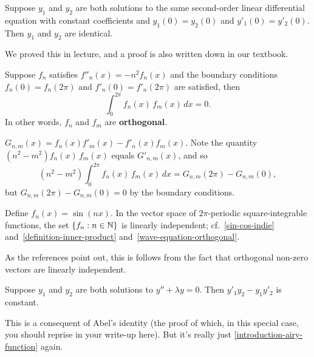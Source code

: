 \documentclass{homework}
\begin{document}
\begin{problem}\label{uniqueness-for-second-order}Suppose $y_1$ and $y_2$ are both solutions to the same second-order linear differential equation with constant coefficients and $y_1(0) = y_2(0)$ and $y'_1(0) = y'_2(0)$.  Then $y_1$ and $y_2$ are identical.
\end{problem}

\begin{solution}
  We proved this in lecture, and a proof is also written down in
  our textbook.
\end{solution}

\begin{problem}\label{wave-equation-orthogonal}Suppose $f_n$ satisfies $f''_n(x) = - n^2 f_n(x)$ and the boundary conditions $f_n(0) = f_n(2\pi)$ and $f'_n(0) = f'_n(2\pi)$ are satisfied, then
  \[
    \int_0^{2\pi} f_n(x) \, f_m(x) \, dx = 0.
  \]
  In other words, $f_n$ and $f_m$ are \textbf{orthogonal}.
\end{problem}

\begin{solution}
  $G_{n,m}(x) = f_n(x) f'_m(x) - f'_n(x) f_m(x)$. Note the quantity $(n^2 - m^2) f_n(x) \, f_m(x)$ equals $G'_{n,m}(x)$, and so
  \[
    (n^2 - m^2) \int_0^{2\pi} f_n(x) \, f_m(x) \, dx = G_{n,m}(2\pi) - G_{n,m}(0),
  \]
  but $G_{n,m}(2\pi) - G_{n,m}(0) = 0$ by the boundary conditions.
\end{solution}

\begin{problem}Define $f_n(x) = \sin \left(nx\right)$.  In the vector
  space of $2\pi$-periodic square-integrable functions, the set
  $\{ f_n : n \in \mathbb{N} \}$ is linearly independent;
  cf.~\ref{sin-cos-indie} and~\ref{definition-inner-product}
  and~\ref{wave-equation-orthogonal}.
\end{problem}

\begin{solution}
  As the references point out, this is follows from the fact that
  orthogonal non-zero vectors are linearly independent.
\end{solution}

\begin{problem}Suppose $y_1$ and $y_2$ are both solutions to
  $y'' + \lambda y = 0$.  Then $y'_1 y_2 - y_1 y'_2$ is constant.
\end{problem}

\begin{solution}
  This is a consequent of Abel's identity (the proof of which, in this
  special case, you should reprise in your write-up here).  But it's
  really just \ref{introduction-airy-function} again.
\end{solution}
\end{document}

